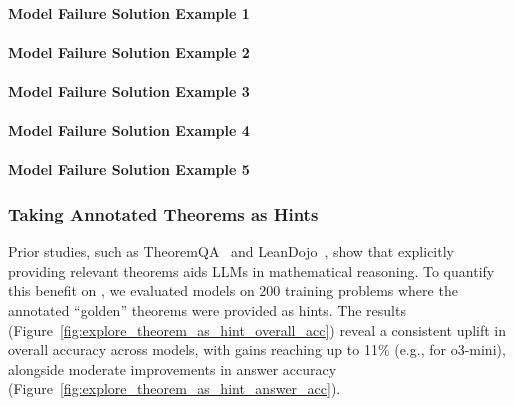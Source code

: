 \paragraph{Model Failure Solution Example 1}
\label{app:failure_solution_example_1}


\clearpage
\paragraph{Model Failure Solution Example 2}
\label{app:failure_solution_example_2}


\clearpage
\paragraph{Model Failure Solution Example 3}
\label{app:failure_solution_example_3}


\clearpage
\paragraph{Model Failure Solution Example 4}
\label{app:failure_solution_example_4}


\clearpage
\paragraph{Model Failure Solution Example 5}
\label{app:failure_solution_example_5}



\clearpage
\subsubsection{Taking Annotated Theorems as Hints}
\label{app:explore_theorem_as_hints_appendix}

Prior studies, such as TheoremQA~\cite{chen-etal-2023-theoremqa} and LeanDojo~\cite{yang2023leandojo}, show that explicitly providing relevant theorems aids LLMs in mathematical reasoning. To quantify this benefit on \dataset, we evaluated models on 200 training problems where the annotated ``golden'' theorems were provided as hints. The results (Figure~\ref{fig:explore_theorem_as_hint_overall_acc}) reveal a consistent uplift in overall accuracy across models, with gains reaching up to 11\% (e.g., for o3-mini), alongside moderate improvements in answer accuracy (Figure~\ref{fig:explore_theorem_as_hint_answer_acc}). 

